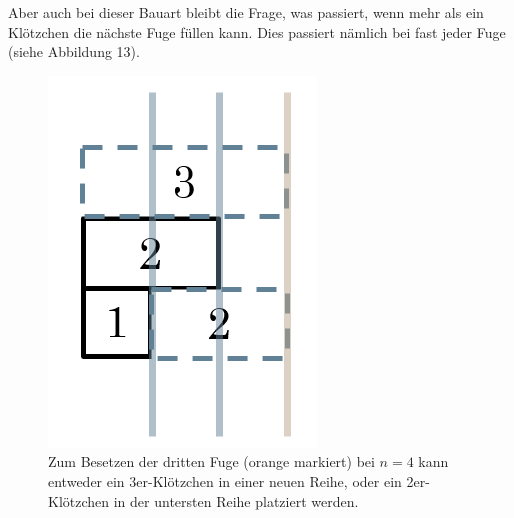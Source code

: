 \documentclass[a4paper,12pt]{article}
\begin{document}
Aber auch bei dieser Bauart bleibt die Frage, was passiert, wenn mehr als ein Klötzchen die nächste Fuge füllen kann. Dies passiert nämlich bei fast jeder Fuge (siehe Abbildung 13).
\begin{figure}[H]
    \centering
    \includegraphics[width=0.3\linewidth]{Bilder/Aufgabe1/Problem_Mauerbauart_02_Mehrere_Kloetze.png}
    \caption{Zum Besetzen der dritten Fuge (orange markiert) bei $n = 4$ kann entweder ein 3er-Klötzchen in einer neuen Reihe, oder ein 2er-Klötzchen in der untersten Reihe platziert werden.}
\end{figure}
\end{document}
